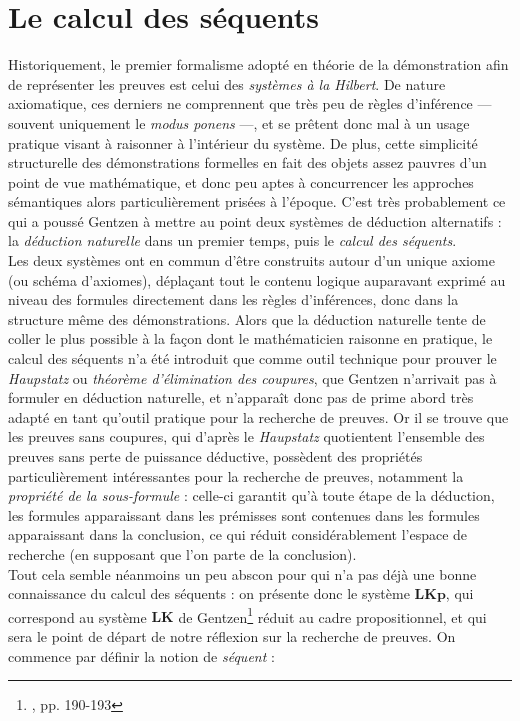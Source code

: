 \documentclass[12pt]{report}
\begin{document}
\section{Le calcul des séquents}

Historiquement, le premier formalisme adopté en théorie de la démonstration afin de représenter les preuves est celui des \emph{systèmes à la Hilbert}. De nature axiomatique, ces derniers ne comprennent que très peu de règles d'inférence --- souvent uniquement le \textit{modus ponens} ---, et se prêtent donc mal à un usage pratique visant à raisonner à l'intérieur du système. De plus, cette simplicité structurelle des démonstrations formelles en fait des objets assez pauvres d'un point de vue mathématique, et donc peu aptes à concurrencer les approches sémantiques alors particulièrement prisées à l'époque. C'est très probablement ce qui a poussé Gentzen à mettre au point deux systèmes de déduction alternatifs : la \emph{déduction naturelle} dans un premier temps, puis le \emph{calcul des séquents}.\\

Les deux systèmes ont en commun d'être construits autour d'un unique axiome (ou schéma d'axiomes), déplaçant tout le contenu logique auparavant exprimé au niveau des formules directement dans les règles d'inférences, donc dans la structure même des démonstrations. Alors que la déduction naturelle tente de coller le plus possible à la façon dont le mathématicien raisonne en pratique, le calcul des séquents n'a été introduit que comme outil technique pour prouver le \textit{Haupstatz} ou \emph{théorème d'élimination des coupures}, que Gentzen n'arrivait pas à formuler en déduction naturelle, et n'apparaît donc pas de prime abord très adapté en tant qu'outil pratique pour la recherche de preuves. Or il se trouve que les preuves sans coupures, qui d'après le \textit{Haupstatz} quotientent l'ensemble des preuves sans perte de puissance déductive, possèdent des propriétés particulièrement intéressantes pour la recherche de preuves, notamment la \emph{propriété de la sous-formule} : celle-ci garantit qu'à toute étape de la déduction, les formules apparaissant dans les prémisses sont contenues dans les formules apparaissant dans la conclusion, ce qui réduit considérablement l'espace de recherche (en supposant que l'on parte de la conclusion).\\

Tout cela semble néanmoins un peu abscon pour qui n'a pas déjà une bonne connaissance du calcul des séquents : on présente donc le système $\mathbf{LKp}$, qui correspond au système $\mathbf{LK}$ de Gentzen\footnote{\cite{Gen35}, pp. 190-193} réduit au cadre propositionnel, et qui sera le point de départ de notre réflexion sur la recherche de preuves. On commence par définir la notion de \emph{séquent} :
\end{document}
